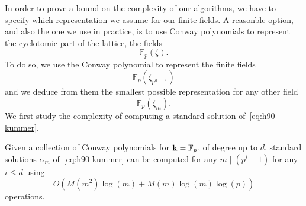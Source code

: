 In order to prove a bound on the complexity of our algorithms, we have to
specify which representation we assume for our finite fields. A reasonble
option, and also the one we use in practice, is to use Conway polynomials to
represent the cyclotomic part of the lattice, \ie the fields
\[
  \mathbb{F}_p(\zeta).
\]
To do so, we use the Conway polynomial to represent the finite fields
\[
  \mathbb{F}_p(\zeta_{p^a-1})
\]
and we deduce from them the smallest possible representation for any other field
\[
  \mathbb{F}_p(\zeta_m).
\]
We first study the complexity of computing a standard solution
of~\eqref{eq:h90-kummer}.
\begin{prop}
  \label{prop:complexity-h90}
  Given a collection of Conway polynomials for $\mathbf{k}=\mathbb{F}_p$, of degree up to
  $d$, standard solutions $\alpha_m$ of~\eqref{eq:h90-kummer} can be computed
  for any $m\mid(p^i-1)$ for any $i\leq d$ using
  \[
    O(M(m^2)\log(m)+M(m)\log(m)\log(p))
  \]
  operations. 
\end{prop}
